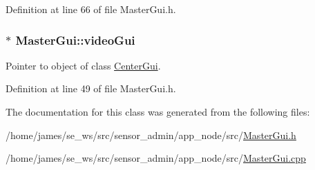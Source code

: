 Definition at line 66 of file Master\-Gui.\-h.

\hypertarget{class_master_gui_a14fd414cca6a387601c408367e37a17d}{
\subsubsection[{video\-Gui}]{ $\ast$ Master\-Gui\-::video\-Gui\hspace{0.3cm}{\ttfamily [private]}}}\label{class_master_gui_a14fd414cca6a387601c408367e37a17d}
Pointer to object of class \hyperlink{class_center_gui}{Center\-Gui}. 

Definition at line 49 of file Master\-Gui.\-h.



The documentation for this class was generated from the following files\-:\begin{DoxyCompactItemize}
\item 
/home/james/se\-\_\-ws/src/sensor\-\_\-admin/app\-\_\-node/src/\hyperlink{app__node_2src_2_master_gui_8h}{Master\-Gui.\-h}\item 
/home/james/se\-\_\-ws/src/sensor\-\_\-admin/app\-\_\-node/src/\hyperlink{app__node_2src_2_master_gui_8cpp}{Master\-Gui.\-cpp}\end{DoxyCompactItemize}

